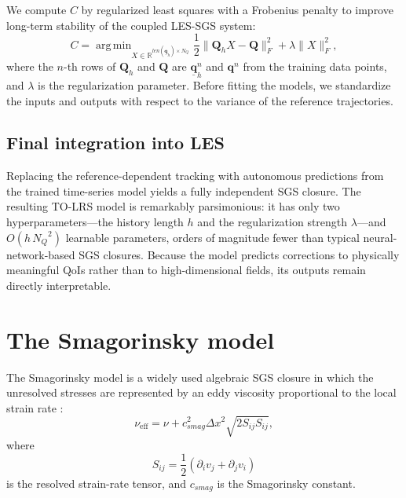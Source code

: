 \documentclass[]{elsarticle}
\DeclareMathOperator*{\argmin}{arg\,min}
\begin{document}
We compute $C$ by regularized least squares with a Frobenius penalty to improve long-term stability of the coupled LES-SGS system:
\begin{equation}
    C = \argmin_{X \in \mathbb{R}^{ len(\underline{\mathbf{q}}_h) \times N_Q}} \frac{1}{2} \lVert \mathbf{Q}_h X - \mathbf{Q} \rVert_F^2 + \lambda \lVert X \rVert_F^2,
\end{equation}
where the $n$-th rows of $\mathbf{Q}_h$ and $\mathbf{Q}$ are $\underline{\mathbf{q}}_h^n$ and $\mathbf{q}^{n}$ from the training data points, and $\lambda$ is the regularization parameter.
Before fitting the models, we standardize the inputs and outputs with respect to the variance of the reference trajectories.

\subsection{Final integration into LES}
Replacing the reference-dependent tracking with autonomous predictions from the trained time-series model yields a fully independent SGS closure. The resulting TO-LRS model is remarkably parsimonious: it has only two hyperparameters---the history length $h$ and the regularization strength $\lambda$---and $O(h \, {N_Q}^2)$ learnable parameters, orders of magnitude fewer than typical neural-network-based SGS closures. Because the model predicts corrections to physically meaningful QoIs rather than to high-dimensional fields, its outputs remain directly interpretable.



\section{The Smagorinsky model}\label{sec:smagorinsky-model}
The Smagorinsky model is a widely used algebraic SGS closure in which the unresolved stresses are represented by an eddy viscosity proportional to the local strain rate \cite{smagorinsky_general_1963}:
\begin{equation}
    \nu_{\text{eff}} = \nu + c_{smag}^2 \Delta x^2 \sqrt{2 S_{ij} S_{ij}},
\end{equation}
where
\begin{equation}
    S_{ij} = \frac{1}{2}\left(\partial_i v_j + \partial_j v_i\right)
\end{equation}
is the resolved strain-rate tensor, and $c_{smag}$ is the Smagorinsky constant.
\end{document}
